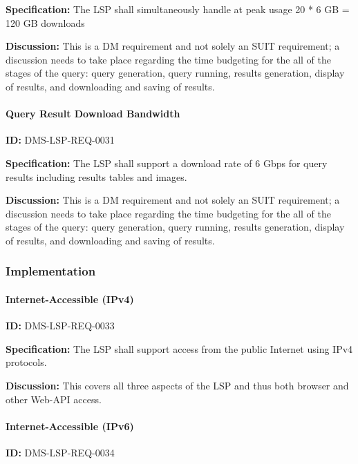 \documentclass[SE,toc,lsstdraft]{lsstdoc}
\begin{document}
\textbf{Specification:}
The LSP shall simultaneously handle at peak usage 20 * 6 GB = 120 GB downloads

\textbf{Discussion:}
This is a DM requirement and not solely an SUIT requirement; a discussion needs to take place regarding the time budgeting for the all of the stages of the query: query generation, query running, results generation, display of results, and downloading and saving of results.

\paragraph{Query Result Download Bandwidth}\hfill  %

\label{DMS-LSP-REQ-0031}
\textbf{ID:} DMS-LSP-REQ-0031

\textbf{Specification:}
The LSP shall support a download rate of 6 Gbps for query results including results tables and images.

\textbf{Discussion:}
This is a DM requirement and not solely an SUIT requirement; a discussion needs to take place regarding the time budgeting for the all of the stages of the query: query generation, query running, results generation, display of results, and downloading and saving of results.

\subsubsection{Implementation}

\paragraph{Internet-Accessible (IPv4)}\hfill  %

\label{DMS-LSP-REQ-0033}
\textbf{ID:} DMS-LSP-REQ-0033

\textbf{Specification:}
The LSP shall support access from the public Internet using IPv4 protocols.

\textbf{Discussion:}
This covers all three aspects of the LSP and thus both browser and other Web-API access.

\paragraph{Internet-Accessible (IPv6)}\hfill  %

\label{DMS-LSP-REQ-0034}
\textbf{ID:} DMS-LSP-REQ-0034
\end{document}
